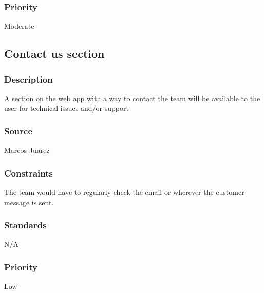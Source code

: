 \subsubsection{Priority}
Moderate
\newline 

\subsection{Contact us section}
\subsubsection{Description}
A section on the web app with a way to contact the team will be available to the user for technical issues and/or support
\subsubsection{Source}
Marcos Juarez
\subsubsection{Constraints}
The team would have to regularly check the email or wherever the customer message is sent.
\subsubsection{Standards}
N/A
\subsubsection{Priority}
Low